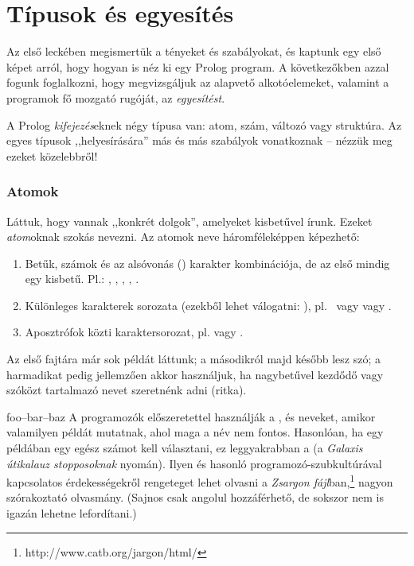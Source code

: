 
\chapter{Típusok és egyesítés}
Az első leckében megismertük a tényeket és
szabályokat, és kaptunk egy első képet arról, hogy
hogyan is néz ki egy Prolog program. A következőkben
azzal fogunk foglalkozni, hogy megvizsgáljuk az
alapvető alkotóelemeket, valamint a programok fő
mozgató rugóját, az \emph{egyesítést}.

A Prolog \emph{kifejezés}\/eknek négy típusa van:
atom, szám, változó vagy struktúra. Az egyes típusok
,,helyesírására'' más és más szabályok vonatkoznak
-- nézzük meg ezeket közelebbről!
\subsection*{Atomok}
Láttuk, hogy vannak ,,konkrét dolgok'', amelyeket
kisbetűvel í\-runk. Ezeket \emph{atom}\/oknak szokás
nevezni. Az atomok neve háromféleképpen képezhető:
\begin{enumerate}
\item Betűk, számok és az alsóvonás (\pr{\_})
  karakter kombinációja, de az első mindig egy
  kisbetű. Pl.: , , ,
  , .
\item Különleges karakterek sorozata (ezekből lehet
  válogatni: ),
  pl.~ vagy \pr{==>} vagy \pr{+}.
\item Aposztrófok közti karaktersorozat,
  pl.  vagy .
\end{enumerate}
Az első fajtára már sok példát láttunk; a másodikról
majd később lesz szó; a harmadikat pedig jellemzően
akkor használjuk, ha nagybetűvel kezdődő vagy
szóközt tartalmazó nevet szeretnénk adni (ritka).

\begin{infobox}{}{foo--bar--baz}
A programozók előszeretettel használják a ,
 és  neveket, amikor valamilyen
példát mutatnak, ahol maga a név nem
fontos. Hasonlóan, ha egy példában egy egész számot
kell választani, ez leggyakrabban a  (a
\emph{Galaxis útikalauz stopposoknak} nyomán). Ilyen
és hasonló programozó-szubkultúrával kapcsolatos
érdekességekről rengeteget lehet olvasni a \emph{Zsargon
  fájl}\/ban,\footnote[2]{http://www.catb.org/jargon/html/}
nagyon szórakoztató olvasmány. (Sajnos csak angolul
hozzáférhető, de sokszor nem is igazán lehetne
lefordítani.)
\end{infobox}

